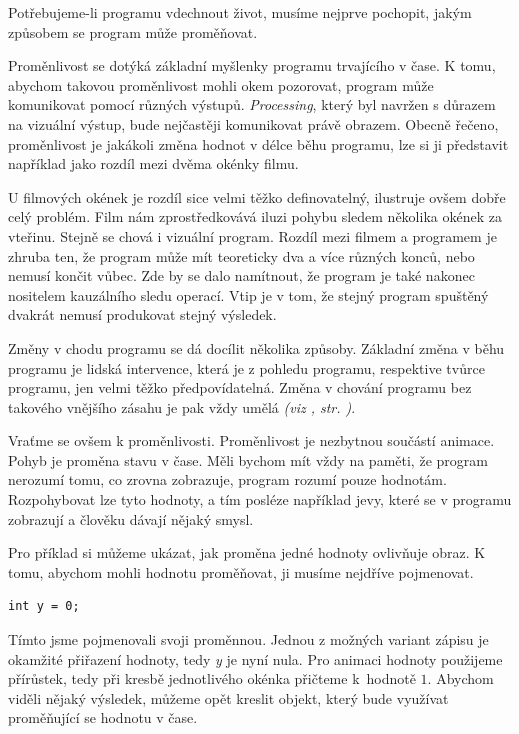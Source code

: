 \documentclass[10pt,twoside=true,open=right,cleardoublepage=empty,chapterprefix=true]{scrbook}
\newcommand{\odkaz}[1]{\textit{(viz \nameref{#1}, str. \pageref*{#1})}}
\newcommand{\lnb}{\linebreak}
\begin{document}
Potřebujeme-li programu vdechnout život, musíme nejprve pochopit, jakým způsobem se program může proměňovat.

Proměnlivost se dotýká základní myšlenky programu trvajícího v čase. K tomu, abychom takovou proměnlivost mohli okem pozorovat, program může komunikovat pomocí různých výstupů. {\em Processing}, který byl navržen s důrazem na vizuální výstup, bude nejčastěji komunikovat právě obrazem. Obecně řečeno, proměnlivost je jakákoli změna hodnot v délce běhu programu, lze si ji představit například jako rozdíl mezi dvěma okénky filmu.

U filmových okének je rozdíl sice velmi těžko definovatelný, ilustruje ovšem dobře celý problém. Film nám zprostředkovává iluzi pohybu sledem několika okének za vteřinu. Stejně se chová i vizuální program. Rozdíl mezi filmem a programem je zhruba ten, že program může mít teoreticky dva a více různých konců, nebo nemusí končit vůbec. Zde by se dalo namítnout, že program je také nakonec nositelem kauzálního sledu operací. Vtip je v tom, že stejný program spuštěný dvakrát nemusí produkovat stejný výsledek.

Změny v chodu programu se dá docílit několika způsoby. Základní změna v běhu programu je lidská intervence, která je z pohledu programu, respektive tvůrce programu, jen velmi těžko předpovídatelná. Změna v chování programu bez takového vnějšího zásahu je pak vždy umělá \odkaz{Náhoda}.


Vraťme se ovšem k proměnlivosti. Proměnlivost je nezbytnou součástí animace. Pohyb je proměna stavu v čase. Měli bychom mít vždy na paměti, že program nerozumí tomu, co zrovna zobrazuje, program rozumí pouze hodnotám. Rozpohybovat lze tyto hodnoty, a tím posléze například jevy, které se v programu zobrazují a člověku dávají nějaký smysl. 

Pro příklad si můžeme ukázat, jak proměna jedné hodnoty ovlivňuje \lnb obraz. K tomu, abychom mohli hodnotu proměňovat, ji musíme nejdříve pojmenovat.

\begin{lstlisting}
int y = 0;
\end{lstlisting}

Tímto jsme pojmenovali svoji proměnnou. Jednou z možných variant zápisu je okamžité přiřazení hodnoty, tedy {\em y} je nyní nula. Pro animaci hodnoty použijeme přírůstek, tedy při kresbě jednotlivého okénka přičteme k~hodnotě $1$. Abychom viděli nějaký výsledek, můžeme opět kreslit objekt, který bude využívat proměňující se hodnotu v čase.
\end{document}
